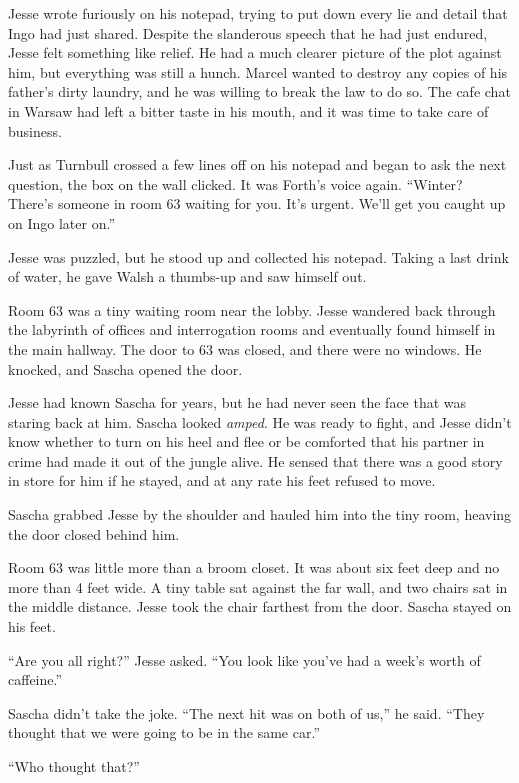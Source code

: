 \documentclass[12pt]{book}
\begin{document}
Jesse wrote furiously on his notepad, trying to put down every lie and detail that Ingo had just shared.  Despite the slanderous speech that he had just endured, Jesse felt something like relief.  He had a much clearer picture of the plot against him, but everything was still a hunch.  Marcel wanted to destroy any copies of his father's dirty laundry, and he was willing to break the law to do so.  The cafe chat in Warsaw had left a bitter taste in his mouth, and it was time to take care of business.

Just as Turnbull crossed a few lines off on his notepad and began to ask the next question, the box on the wall clicked.  It was Forth's voice again.  ``Winter?  There's someone in room 63 waiting for you.  It's urgent.  We'll get you caught up on Ingo later on.''

Jesse was puzzled, but he stood up and collected his notepad.  Taking a last drink of water, he gave Walsh a thumbs-up and saw himself out.

Room 63 was a tiny waiting room near the lobby.  Jesse wandered back through the labyrinth of offices and interrogation rooms and eventually found himself in the main hallway.  The door to 63 was closed, and there were no windows.  He knocked, and Sascha opened the door.

Jesse had known Sascha for years, but he had never seen the face that was staring back at him.  Sascha looked \emph{amped}.  He was ready to fight, and Jesse didn't know whether to turn on his heel and flee or be comforted that his partner in crime had made it out of the jungle alive.  He sensed that there was a good story in store for him if he stayed, and at any rate his feet refused to move.

Sascha grabbed Jesse by the shoulder and hauled him into the tiny room, heaving the door closed behind him.

Room 63 was little more than a broom closet.  It was about six feet deep and no more than 4 feet wide.  A tiny table sat against the far wall, and two chairs sat in the middle distance.  Jesse took the chair farthest from the door.  Sascha stayed on his feet.

``Are you all right?'' Jesse asked.  ``You look like you've had a week's worth of caffeine.''

Sascha didn't take the joke.  ``The next hit was on both of us,'' he said.  ``They thought that we were going to be in the same car.''

``Who thought that?''
\end{document}
